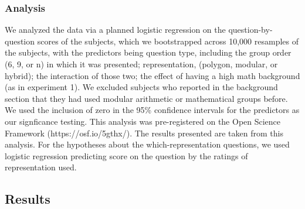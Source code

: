 \documentclass[11pt]{article}
\begin{document}
\subsubsection{Analysis}
We analyzed the data via a planned logistic regression on the question-by-question scores of the subjects, which we bootstrapped across 10,000 resamples of the subjects, with the predictors being question type, including the group order (6, 9, or n) in which it was presented; representation, (polygon, modular, or hybrid); the interaction of those two; the effect of having a high math background (as in experiment 1). We excluded subjects who reported in the background section that they had used modular arithmetic or mathematical groups before. We used the inclusion of zero in the 95\% confidence intervals for the predictors as our signficance testing. This analysis was pre-registered on the Open Science Framework (https://osf.io/5gthx/). The results presented are taken from this analysis. For the hypotheses about the which-representation questions, we used logistic regression predicting score on the question by the ratings of representation used.
\subsection{Results} %
\end{document}
